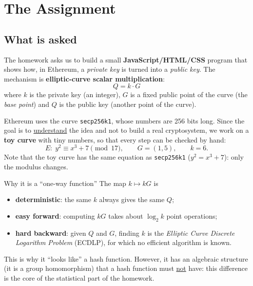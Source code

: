 \section{The Assignment}


\subsection{What is asked}

The homework asks us to build a small \textbf{JavaScript/HTML/CSS} program that shows how, in Ethereum, a \textit{private key} is turned into a \textit{public key}. The mechanism is \textbf{elliptic-curve scalar multiplication}:
\[
  Q = k \cdot G
\]
where $k$ is the private key (an integer), $G$ is a fixed public point of the curve (the \textit{base point}) and $Q$ is the public key (another point of the curve).

Ethereum uses the curve \texttt{secp256k1}, whose numbers are 256 bits long. Since the goal is to \underline{understand} the idea and not to build a real cryptosystem, we work on a \textbf{toy curve} with tiny numbers, so that every step can be checked by hand:
\[
  E:\; y^2 \equiv x^3 + 7 \pmod{17}, \qquad G = (1,5), \qquad k = 6.
\]
Note that the toy curve has the same equation as \texttt{secp256k1} ($y^2 = x^3 + 7$): only the modulus changes.

\begin{framedobs}{Why it is a ``one-way function''}
  The map $k \mapsto kG$ is
  \begin{itemize}
    \item \textbf{deterministic}: the same $k$ always gives the same $Q$;
    \item \textbf{easy forward}: computing $kG$ takes about $\log_2 k$ point operations;
    \item \textbf{hard backward}: given $Q$ and $G$, finding $k$ is the \textit{Elliptic Curve Discrete Logarithm Problem} (ECDLP), for which no efficient algorithm is known.
  \end{itemize}
  This is why it ``looks like'' a hash function. However, it has an algebraic structure (it is a group homomorphism) that a hash function must \underline{not} have: this difference is the core of the statistical part of the homework.
\end{framedobs}

